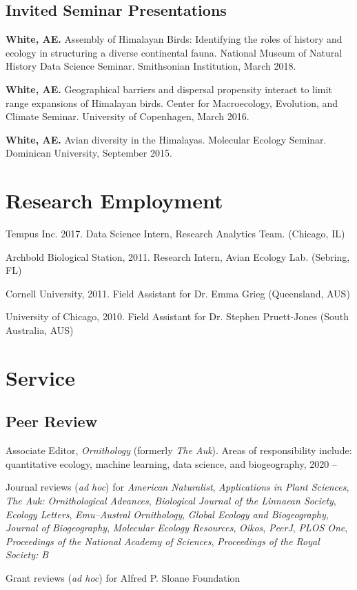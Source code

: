 \documentclass[letterpaper]{article}
\renewenvironment{itemize}{
  \begin{list}{}{
    \setlength{\leftmargin}{1.5em}
  }
}{
  \end{list}
}
\newenvironment{biblist}{%
   \begin{list}{}{%
     \setlength{\labelwidth}{0pt}%
     \setlength{\labelsep}{1em}%
     \setlength{\leftmargin}{2em}%
     \setlength{\itemindent}{-1em}%
   }
}{\end{list}}
\begin{document}
\subsection*{Invited Seminar Presentations}
\begin{biblist}
\item \textbf{White, AE.} Assembly of Himalayan Birds: Identifying the roles of history and ecology in structuring a diverse continental fauna. National Museum of Natural History Data Science Seminar. Smithsonian Institution, March 2018.
\item \textbf{White, AE.} Geographical barriers and dispersal propensity interact to limit range expansions of Himalayan birds. Center for Macroecology, Evolution, and Climate Seminar. University of Copenhagen, March 2016.
\item \textbf{White, AE.} Avian diversity in the Himalayas. Molecular Ecology Seminar. Dominican University, September 2015.
\end{biblist}

\section*{Research Employment}
\begin{itemize}
\item Tempus Inc. 2017. Data Science Intern, Research Analytics Team. (Chicago, IL) 
\item Archbold Biological Station, 2011. Research Intern, Avian Ecology Lab. (Sebring, FL)
\item Cornell University, 2011. Field Assistant for Dr. Emma Grieg (Queensland, AUS)
\item University of Chicago, 2010. Field Assistant for Dr. Stephen Pruett-Jones (South Australia, AUS)
\end{itemize}



\section*{Service}
\subsection*{Peer Review}
\begin{biblist}
\item Associate Editor, \emph{Ornithology} (formerly \emph{The Auk}). Areas of responsibility include: quantitative ecology, machine learning, data science, and biogeography, 2020 --
\item Journal reviews (\emph{ad hoc}) for \emph{American Naturalist},  \emph{Applications in Plant Sciences}, \emph{The Auk: Ornithological Advances}, \emph{Biological Journal of the Linnaean Society}, \emph{Ecology Letters}, \emph{Emu--Austral Ornithology}, \emph{Global Ecology and Biogeography}, \emph{Journal of Biogeography}, \emph{Molecular Ecology Resources}, \emph{Oikos}, \emph{PeerJ}, \emph{PLOS One}, \emph{Proceedings of the National Academy of Sciences}, \emph{Proceedings of the Royal Society: B}
\item Grant reviews (\emph{ad hoc}) for Alfred P. Sloane Foundation
\end{biblist}
\end{document}
